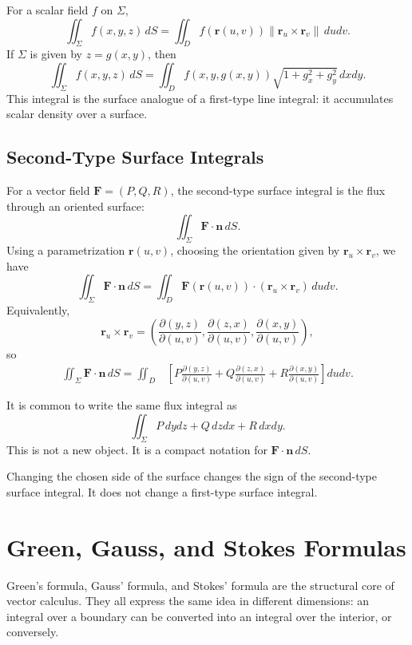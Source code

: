 For a scalar field $f$ on $\Sigma$,
\[
    \iint_{\Sigma} f(x,y,z)\,dS
    =\iint_D f(\mathbf r(u,v))\|\mathbf r_u\times\mathbf r_v\|\,dudv.
\]
If $\Sigma$ is given by $z=g(x,y)$, then
\[
    \iint_{\Sigma} f(x,y,z)\,dS
    =\iint_D f(x,y,g(x,y))\sqrt{1+g_x^2+g_y^2}\,dxdy.
\]
This integral is the surface analogue of a first-type line integral: it accumulates scalar density over a surface.

\subsection{Second-Type Surface Integrals}

For a vector field $\mathbf F=(P,Q,R)$, the second-type surface integral is the flux through an oriented surface:
\[
    \iint_{\Sigma}\mathbf F\cdot\mathbf n\,dS.
\]
Using a parametrization $\mathbf r(u,v)$, choosing the orientation given by $\mathbf r_u\times\mathbf r_v$, we have
\[
    \iint_{\Sigma}\mathbf F\cdot\mathbf n\,dS
    =\iint_D \mathbf F(\mathbf r(u,v))\cdot(\mathbf r_u\times\mathbf r_v)\,dudv.
\]
Equivalently,
\[
    \mathbf r_u\times\mathbf r_v
    =
    \left(
    \frac{\partial(y,z)}{\partial(u,v)},
    \frac{\partial(z,x)}{\partial(u,v)},
    \frac{\partial(x,y)}{\partial(u,v)}
    \right),
\]
so
\[
\begin{aligned}
    \iint_{\Sigma}\mathbf F\cdot\mathbf n\,dS
    =\iint_D &\left[
    P\frac{\partial(y,z)}{\partial(u,v)}
    +Q\frac{\partial(z,x)}{\partial(u,v)}
    +R\frac{\partial(x,y)}{\partial(u,v)}
    \right]dudv.
\end{aligned}
\]

It is common to write the same flux integral as
\[
    \iint_{\Sigma} P\,dydz+Q\,dzdx+R\,dxdy.
\]
This is not a new object. It is a compact notation for $\mathbf F\cdot\mathbf n\,dS$.

\begin{note}
Changing the chosen side of the surface changes the sign of the second-type surface integral. It does not change a first-type surface integral.
\end{note}

\section{Green, Gauss, and Stokes Formulas}

Green's formula, Gauss' formula, and Stokes' formula are the structural core of vector calculus. They all express the same idea in different dimensions: an integral over a boundary can be converted into an integral over the interior, or conversely.

